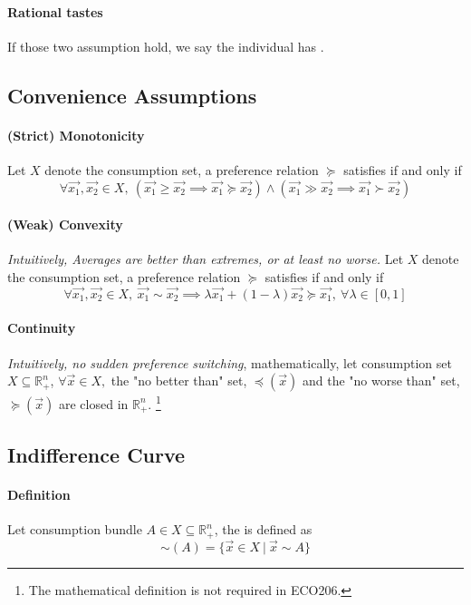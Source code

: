 \documentclass{article}
\begin{document}
\paragraph{Rational tastes} If those two assumption hold, we say the individual has .

\subsection{Convenience Assumptions}
\paragraph{(Strict) Monotonicity} Let $X$ denote the consumption set, a preference relation $\succcurlyeq$ satisfies  if and only if
\[
	\forall \vec{x_1}, \vec{x_2} \in X,\ (\vec{x_1} \geq \vec{x_2} \implies \vec{x_1} \succcurlyeq \vec{x_2}) \land (\vec{x_1} \gg \vec{x_2} \implies \vec{x_1} \succ \vec{x_2})
\]

\paragraph{(Weak) Convexity} \emph{Intuitively, Averages are better than extremes, or at least
no worse.} Let $X$ denote the consumption set, a preference relation $\succcurlyeq$ satisfies
 if and only if
\[
	\forall \vec{x_1}, \vec{x_2} \in X,\ \vec{x_1} \sim \vec{x_2} \implies \lambda \vec{x_1} + (1 - \lambda) \vec{x_2} \succcurlyeq \vec{x_1},\ \forall \lambda \in [0, 1]
\]

\paragraph{Continuity} \emph{Intuitively, no sudden preference switching},  mathematically, let consumption set $X \subseteq \mathbb{R}^n_{+}$, $\forall \vec{x} \in X,$ the "no better than" set, $\preccurlyeq(\vec{x})$ and the "no worse than" set, $\succcurlyeq(\vec{x})$ are closed in $\mathbb{R}^n_{+}$. \footnote{The mathematical definition is not required in ECO206.}

\subsection{Indifference Curve}
\paragraph{Definition} Let consumption bundle $A \in X \subseteq \mathbb{R}^n_{+}$, the  is defined as
\[
	\sim(A) = \{\vec{x} \in X\ \vert\ \vec{x} \sim A\}
\]
\end{document}
